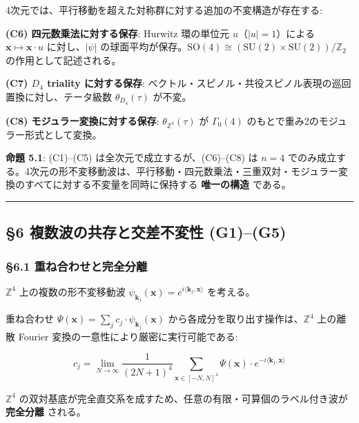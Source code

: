 \documentclass[
  a4paper,11pt]{ltjsarticle}
\theoremstyle{definition}
\theoremstyle{remark}
\begin{document}
4次元では、平行移動を超えた対称群に対する追加の不変構造が存在する:

\textbf{(C6) 四元数乗法に対する保存}: Hurwitz 環の単位元
\(u\)（\(|u| = 1\)）による \(\mathbf{x} \mapsto \mathbf{x} \cdot u\)
に対し、\(|\psi|\)
の球面平均が保存。\(\mathrm{SO}(4) \cong (\mathrm{SU}(2) \times \mathrm{SU}(2))/\mathbb{Z}_2\)
の作用として記述される。

\textbf{(C7) \(D_4\) triality に対する保存}:
ベクトル・スピノル・共役スピノル表現の巡回置換に対し、テータ級数
\(\theta_{D_4}(\tau)\) が不変。

\textbf{(C8) モジュラー変換に対する保存}:
\(\theta_{\mathbb{Z}^4}(\tau)\) が \(\Gamma_0(4)\)
のもとで重み2のモジュラー形式として変換。

\textbf{命題 5.1}: (C1)--(C5) は全次元で成立するが、(C6)--(C8) は
\(n = 4\)
でのみ成立する。4次元の形不変移動波は、平行移動・四元数乗法・三重双対・モジュラー変換のすべてに対する不変量を同時に保持する
\textbf{唯一の構造} である。

\begin{center}\rule{0.5\linewidth}{0.5pt}\end{center}

\subsection{§6 複数波の共存と交差不変性
(G1)--(G5)}\label{ux8907ux6570ux6ce2ux306eux5171ux5b58ux3068ux4ea4ux5deeux4e0dux5909ux6027-g1g5}

\subsubsection{§6.1
重ね合わせと完全分離}\label{ux91cdux306dux5408ux308fux305bux3068ux5b8cux5168ux5206ux96e2}

\(\mathbb{Z}^4\) 上の複数の形不変移動波
\(\psi_{\mathbf{k}_j}(\mathbf{x}) = e^{i\langle \mathbf{k}_j, \mathbf{x} \rangle}\)
を考える。

重ね合わせ
\(\Psi(\mathbf{x}) = \sum_j c_j \cdot \psi_{\mathbf{k}_j}(\mathbf{x})\)
から各成分を取り出す操作は、\(\mathbb{Z}^4\) 上の離散 Fourier
変換の一意性により厳密に実行可能である:

\[c_j = \lim_{N \to \infty} \frac{1}{(2N+1)^4} \sum_{\mathbf{x} \in [-N,N]^4} \Psi(\mathbf{x}) \cdot e^{-i\langle \mathbf{k}_j, \mathbf{x} \rangle}\]

\(\mathbb{Z}^4\)
の双対基底が完全直交系を成すため、任意の有限・可算個のラベル付き波が
\textbf{完全分離} される。
\end{document}
